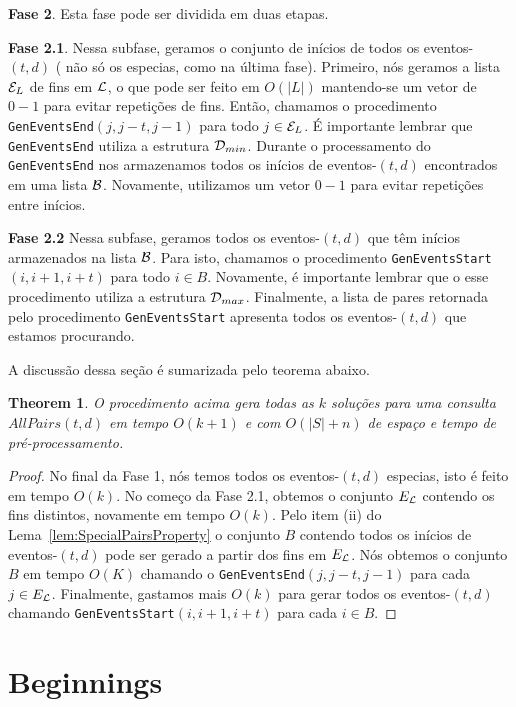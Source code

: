 \documentclass[12pt]{article}
\newtheorem{thm}{Theorem}[section]
\begin{document}
\textbf{Fase 2}. Esta fase pode ser dividida em duas etapas.

\textbf{Fase 2.1}. Nessa subfase, geramos o conjunto de inícios de todos os eventos-$(t,d)$ (
não só os especias, como na última fase).
Primeiro, nós geramos a lista ${\cal E}_L$ de fins em ${\cal L}$, o que
pode ser feito em $O(|L|)$ mantendo-se um vetor de $0-1$ para evitar repetições de fins. Então,
chamamos o procedimento {\tt GenEventsEnd}$(j, j - t, j - 1)$ para todo $j \in {\cal E}_L$. É 
importante lembrar que {\tt GenEventsEnd} utiliza a estrutura ${\cal D}_{min}$. Durante o processamento
do {\tt GenEventsEnd} nos armazenamos todos os inícios de eventos-$(t,d)$ encontrados em uma lista
${\cal B}$. Novamente, utilizamos um vetor $0-1$ para evitar repetições entre inícios.

\textbf{Fase 2.2} Nessa subfase, geramos todos os eventos-$(t,d)$ que têm inícios armazenados
na lista ${\cal B}$. Para isto, chamamos o procedimento {\tt GenEventsStart}$(i, i + 1, i + t)$ para
todo $i \in B$. Novamente, é importante lembrar que o esse procedimento utiliza a estrutura ${\cal D}_{max}$.
Finalmente, a lista de pares retornada pelo procedimento {\tt GenEventsStart} apresenta todos os eventos-$(t,d)$ que estamos procurando.

A discussão dessa seção é sumarizada pelo teorema abaixo.

\begin{thm}
O procedimento acima gera todas as $k$ soluções para uma consulta $AllPairs(t, d)$ em tempo $O(k + 1)$
e com $O(|S| + n)$ de espaço e tempo de pré-processamento.
\end{thm}
\begin{proof}
No final da Fase 1, nós temos todos os eventos-$(t,d)$ especias,
isto é feito em tempo $O(k)$. No começo da Fase 2.1,
obtemos o conjunto $E_{\cal{L}}$ contendo os fins distintos,
novamente em tempo $O(k)$. Pelo item (ii) do Lema~\ref{lem:SpecialPairsProperty}
o conjunto $B$ contendo todos os inícios de eventos-$(t,d)$ pode ser gerado a partir
dos fins em $E_{\cal{L}}$. Nós obtemos o conjunto $B$ em tempo $O(K)$ chamando o {\tt GenEventsEnd}$(j,j-t,j-1)$
para cada $j \in E_{\cal{L}}$. Finalmente, gastamos mais $O(k)$ para gerar todos os eventos-$(t,d)$
chamando {\tt GenEventsStart}$(i,i+1,i+t)$ para cada $i \in B$.
\end{proof}


\section{Beginnings}
\end{document}
